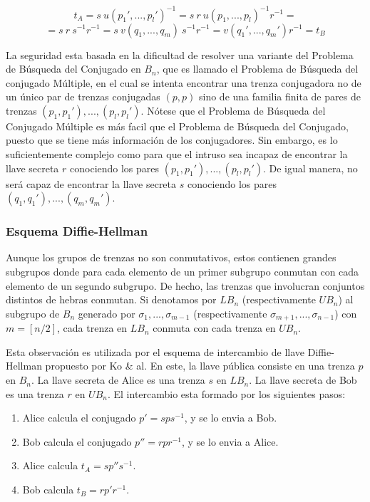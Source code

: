 \documentclass[12pt]{article}
\theoremstyle{definition}
\begin{document}
$$t_A = s\ u(p_1',...,p_l')^{-1} = s\ r\ u(p_1,...,p_l)^{-1}r^{-1}=$$
$$=s\ r\ s^{-1}r^{-1}= s\ v(q_1,...,q_m)\ s^{-1}r^{-1}=v(q_1',...,q_m')r^{-1} = t_B$$

La seguridad esta basada en la dificultad de resolver una variante del Problema de Búsqueda del Conjugado en $B_n$, que es llamado el Problema de Búsqueda del conjugado Múltiple, en el cual se intenta encontrar una trenza conjugadora no de un único par de trenzas conjugadas $(p,p)$ sino de una familia finita de pares de trenzas $(p_1,p_1'),...,(p_l,p_l')$. Nótese que el Problema de Búsqueda del Conjugado Múltiple es más facil que el Problema de Búsqueda del Conjugado, puesto que se tiene más información de los conjugadores. Sin embargo, es lo suficientemente complejo como para que el intruso sea incapaz de encontrar la llave secreta $r$ conociendo los pares $(p_1,p_1'),...,(p_l,p_l')$. De igual manera, no será capaz de encontrar la llave secreta $s$ conociendo los pares $(q_1,q_1'),...,(q_m,q_m')$.

\subsubsection{Esquema Diffie-Hellman} Aunque los grupos de trenzas no son conmutativos, estos contienen grandes subgrupos donde para cada elemento de un primer subgrupo conmutan con cada elemento de un segundo subgrupo. De hecho, las trenzas que involucran conjuntos distintos de hebras conmutan. Si denotamos por $LB_n$ (respectivamente $UB_n$) al subgrupo de $B_n$ generado por $\sigma_1,...,\sigma_{m-1}$ (respectivamente $\sigma_{m+1},...,\sigma_{n-1}$) con $m=[n/2]$, cada trenza en $LB_n$ conmuta con cada trenza en $UB_n$.

Esta observación es utilizada por el esquema de intercambio de llave Diffie-Hellman propuesto por Ko \& al. En este, la llave pública consiste en una trenza $p$ en $B_n$. La llave secreta de Alice es una trenza $s$ en $LB_n$. La llave secreta de Bob es una trenza $r$ en $UB_n$. El intercambio esta formado por los siguientes pasos:

\begin{enumerate}
\item Alice calcula el conjugado $p'=sps^{-1}$, y se lo envia a Bob.
\item Bob calcula el conjugado $p''=rpr^{-1}$, y se lo envia a Alice.
\item Alice calcula $t_A = sp''s^{-1}$.
\item Bob calcula $t_B = rp'r^{-1}$. 
\end{enumerate}
\end{document}
